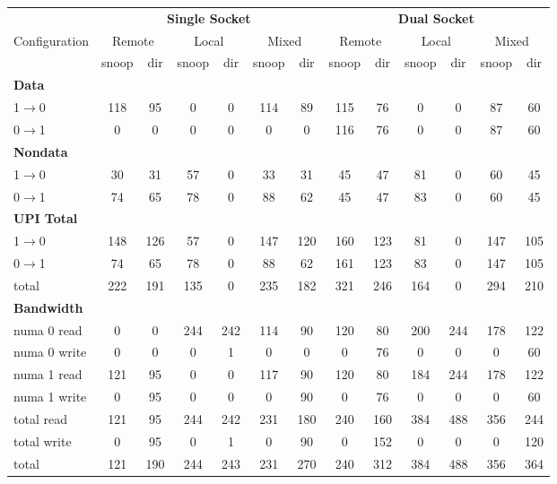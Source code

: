 \begin{table}[t] \centering \small \setlength{\tabcolsep}{5pt}
\renewcommand{\arraystretch}{1.2}

\begin{tabular}{|l|cc|cc|cc||cc|cc|cc|}
\hline

& \multicolumn{6}{c||}{\textbf{Single Socket}}
& \multicolumn{6}{c|}{\textbf{Dual Socket}} \\
\cline{2-13}

Configuration &
\multicolumn{2}{c|}{Remote} &
\multicolumn{2}{c|}{Local} &
\multicolumn{2}{c||}{Mixed} &
\multicolumn{2}{c|}{Remote} &
\multicolumn{2}{c|}{Local} &
\multicolumn{2}{c|}{Mixed} \\
\hline

& snoop & dir
& snoop & dir
& snoop & dir
& snoop & dir
& snoop & dir
& snoop & dir \\
\hline\hline

\multicolumn{13}{|l|}{\textbf{Data}} \\
\hline
1$\rightarrow$0 & 118 & 95 & 0 & 0 & 114 & 89 & 115 & 76 & 0 & 0 & 87 & 60 \\
\hline
0$\rightarrow$1 & 0 & 0 & 0 & 0 & 0 & 0 & 116 & 76 & 0 & 0 & 87 & 60 \\
\hline

\multicolumn{13}{|l|}{\textbf{Nondata}} \\
\hline
1$\rightarrow$0 & 30 & 31 & 57 & 0 & 33 & 31 & 45 & 47 & 81 & 0 & 60 & 45 \\
\hline
0$\rightarrow$1 & 74 & 65 & 78 & 0 & 88 & 62 & 45 & 47 & 83 & 0 & 60 & 45 \\
\hline

\multicolumn{13}{|l|}{\textbf{UPI Total}} \\
\hline
1$\rightarrow$0 & 148 & 126 & 57 & 0 & 147 & 120 & 160 & 123 & 81 & 0 & 147 & 105 \\
\hline
0$\rightarrow$1 & 74 & 65 & 78 & 0 & 88 & 62 & 161 & 123 & 83 & 0 & 147 & 105 \\
\hline
total           & 222 & 191 & 135 & 0 & 235 & 182 & 321 & 246 & 164 & 0 & 294 & 210 \\
\hline

\multicolumn{13}{|l|}{\textbf{Bandwidth}} \\
\hline
numa 0 read     & 0 & 0 & 244 & 242 & 114 & 90 & 120 & 80 & 200 & 244 & 178 & 122 \\
\hline
numa 0 write    & 0 & 0 & 0 & 1 & 0 & 0 & 0 & 76 & 0 & 0 & 0 & 60 \\
\hline
numa 1 read     & 121 & 95 & 0 & 0 & 117 & 90 & 120 & 80 & 184 & 244 & 178 & 122 \\
\hline
numa 1 write    & 0 & 95 & 0 & 0 & 0 & 90 & 0 & 76 & 0 & 0 & 0 & 60 \\
\hline
total read      & 121 & 95 & 244 & 242 & 231 & 180 & 240 & 160 & 384 & 488 & 356 & 244 \\
\hline
total write     & 0 & 95 & 0 & 1 & 0 & 90 & 0 & 152 & 0 & 0 & 0 & 120 \\
\hline
total           & 121 & 190 & 244 & 243 & 231 & 270 & 240 & 312 & 384 & 488 & 356 & 364 \\
\hline


\end{tabular}
\end{table}
